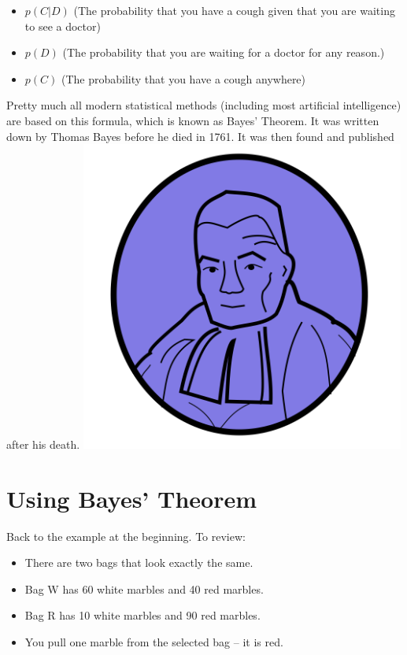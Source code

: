 \begin{itemize}
\item $p(C | D)$ (The probability that you have a cough given that you are waiting to see a doctor)
\item $p(D)$ (The probability that you are waiting for a doctor for any reason.)
\item $p(C)$ (The probability that you have a cough anywhere)
\end{itemize}

Pretty much all modern statistical methods (including most artificial
intelligence) are based on this formula, which is known as Bayes'
Theorem. It was written down by Thomas Bayes before he died in
1761. It was then found and published after his death.
\includegraphics[width=0.8\textwidth]{Bayes.png}

\section{Using Bayes' Theorem}

Back to the example at the beginning. To review:

\begin{itemize}
\item There are two bags that look exactly the same.
\item Bag W has 60 white marbles and 40 red marbles.
\item Bag R has 10 white marbles and 90 red marbles.
\item You pull one marble from the selected bag -- it is red.
\end{itemize}

